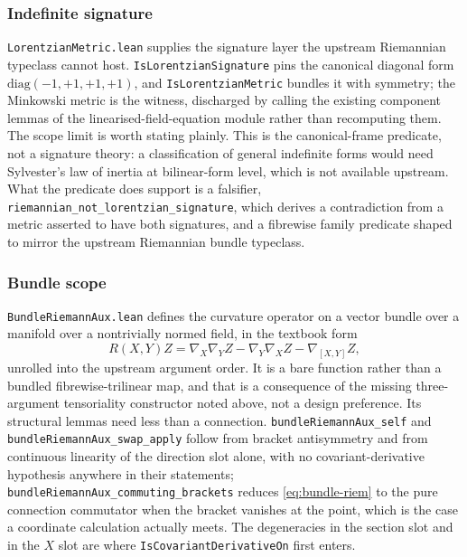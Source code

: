 \documentclass[11pt]{article}
\begin{document}
\subsubsection{Indefinite signature}

\texttt{LorentzianMetric.lean} supplies the signature layer the upstream
Riemannian typeclass cannot host. \texttt{IsLorentzianSignature} pins the
canonical diagonal form $\mathrm{diag}(-1,+1,+1,+1)$, and
\texttt{IsLorentzianMetric} bundles it with symmetry; the Minkowski
metric is the witness, discharged by calling the existing component
lemmas of the linearised-field-equation module rather than recomputing
them. The scope limit is worth stating plainly. This is the
canonical-frame predicate, not a signature theory: a classification of
general indefinite forms would need Sylvester's law of inertia at
bilinear-form level, which is not available upstream. What the predicate
does support is a falsifier,
\texttt{riemannian\_not\_lorentzian\_signature}, which derives a
contradiction from a metric asserted to have both signatures, and a
fibrewise family predicate shaped to mirror the upstream Riemannian
bundle typeclass.

\subsubsection{Bundle scope}

\texttt{BundleRiemannAux.lean} defines the curvature operator on a vector
bundle over a manifold over a nontrivially normed field, in the textbook
form
\begin{equation}
R(X, Y)Z = \nabla_{X}\nabla_{Y}Z - \nabla_{Y}\nabla_{X}Z
           - \nabla_{[X, Y]}Z,
\label{eq:bundle-riem}
\end{equation}
unrolled into the upstream argument order. It is a bare function rather
than a bundled fibrewise-trilinear map, and that is a consequence of the
missing three-argument tensoriality constructor noted above, not a design
preference. Its structural lemmas need less than a connection.
\texttt{bundleRiemannAux\_self} and
\texttt{bundleRiemannAux\_swap\_apply} follow from bracket
antisymmetry and from continuous linearity of the direction slot alone,
with no covariant-derivative hypothesis anywhere in their statements;
\texttt{bundleRiemannAux\_commuting\_brackets} reduces
\eqref{eq:bundle-riem} to the pure connection commutator when the
bracket vanishes at the point, which is the case a coordinate
calculation actually meets. The degeneracies in the section slot and in
the $X$ slot are where \texttt{IsCovariantDerivativeOn} first enters.
\end{document}
